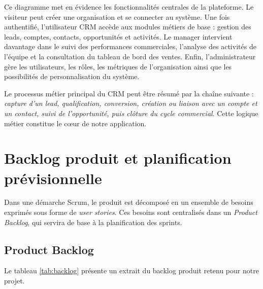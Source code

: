 \documentclass[12pt,a4paper,twoside,openany]{book}
\begin{document}
\newpage

Ce diagramme met en évidence les fonctionnalités centrales de la plateforme. Le visiteur peut créer une organisation et se connecter au système. Une fois authentifié, l’utilisateur CRM accède aux modules métiers de base : gestion des leads, comptes, contacts, opportunités et activités. Le manager intervient davantage dans le suivi des performances commerciales, l’analyse des activités de l’équipe et la consultation du tableau de bord des ventes. Enfin, l’administrateur gère les utilisateurs, les rôles, les métriques de l’organisation ainsi que les possibilités de personnalisation du système.

Le processus métier principal du CRM peut être résumé par la chaîne suivante : \textit{capture d’un lead, qualification, conversion, création ou liaison avec un compte et un contact, suivi de l’opportunité, puis clôture du cycle commercial}. Cette logique métier constitue le cœur de notre application.

\section{Backlog produit et planification prévisionnelle}

Dans une démarche Scrum, le produit est décomposé en un ensemble de besoins exprimés sous forme de \textit{user stories}. Ces besoins sont centralisés dans un \textit{Product Backlog}, qui servira de base à la planification des sprints.

\subsection{Product Backlog}

Le tableau \ref{tab:backlog} présente un extrait du backlog produit retenu pour notre projet.
\end{document}
